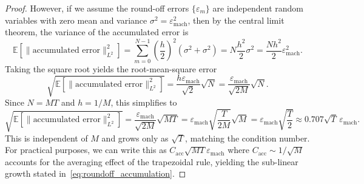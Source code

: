 \documentclass[10pt,a4paper]{amsart}
\begin{document}
\begin{proof}
\noindent However, if we assume the round-off errors $\{\varepsilon_m\}$ are independent random variables with zero mean and variance $\sigma^2 = \varepsilon_{\mathrm{mach}}^2$, then by the central limit theorem, the variance of the accumulated error is
\begin{equation}
    \mathbb{E}\left[ \|\text{accumulated error}\|_{L^2}^2 \right] = \sum_{m=0}^{N-1} \left( \frac{h}{2} \right)^2 \left( \sigma^2 + \sigma^2 \right) = N \frac{h^2}{2} \sigma^2 = \frac{Nh^2}{2} \varepsilon_{\mathrm{mach}}^2.
\end{equation}
Taking the square root yields the root-mean-square error
\begin{equation}
    \sqrt{\mathbb{E}\left[ \|\text{accumulated error}\|_{L^2}^2 \right]} = \frac{h\varepsilon_{\mathrm{mach}}}{\sqrt{2}} \sqrt{N} = \frac{\varepsilon_{\mathrm{mach}}}{\sqrt{2M}} \sqrt{N}.
\end{equation}
Since $N = MT$ and $h = 1/M$, this simplifies to
\begin{equation}
    \sqrt{\mathbb{E}\left[ \|\text{accumulated error}\|_{L^2}^2 \right]} = \frac{\varepsilon_{\mathrm{mach}}}{\sqrt{2M}} \sqrt{MT} = \varepsilon_{\mathrm{mach}} \sqrt{\frac{T}{2M}} \sqrt{M} = \varepsilon_{\mathrm{mach}} \sqrt{\frac{T}{2}} \approx 0.707 \sqrt{T} \, \varepsilon_{\mathrm{mach}}.
\end{equation}
This is independent of $M$ and grows only as $\sqrt{T}$, matching the condition number. For practical purposes, we can write this as $C_{\mathrm{acc}} \sqrt{MT} \varepsilon_{\mathrm{mach}}$ where $C_{\mathrm{acc}} \sim 1/\sqrt{M}$ accounts for the averaging effect of the trapezoidal rule, yielding the sub-linear growth stated in~\eqref{eq:roundoff_accumulation}.
\end{proof}
\end{document}
